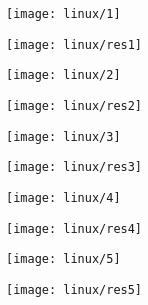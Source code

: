 \documentclass[draft,final]{vutinfth} %
\begin{document}
\begin{appendices}
		\begin{figure}[H]
			\centering
			\begin{subfigure}[b]{0.45\columnwidth}
				\centering
				\texttt{[image: linux/1]}
			\end{subfigure}
			\begin{subfigure}[b]{0.45\columnwidth}
				\centering
				\texttt{[image: linux/res1]}
			\end{subfigure}
		\end{figure}   
		\begin{figure}[H]
			\centering
			\begin{subfigure}[b]{0.45\columnwidth}
				\centering
				\texttt{[image: linux/2]}
			\end{subfigure}
			\begin{subfigure}[b]{0.45\columnwidth}
				\centering
				\texttt{[image: linux/res2]}
			\end{subfigure}
		\end{figure}   
		\begin{figure}[H]
			\centering
			\begin{subfigure}[b]{0.45\columnwidth}
				\centering
				\texttt{[image: linux/3]}
			\end{subfigure}
			\begin{subfigure}[b]{0.45\columnwidth}
				\centering
				\texttt{[image: linux/res3]}
			\end{subfigure}
		\end{figure}   
		\begin{figure}[H]
			\centering
			\begin{subfigure}[b]{0.45\columnwidth}
				\centering
				\texttt{[image: linux/4]}
			\end{subfigure}
			\begin{subfigure}[b]{0.45\columnwidth}
				\centering
				\texttt{[image: linux/res4]}
			\end{subfigure}
		\end{figure}   
		\begin{figure}[H]
			\centering
			\begin{subfigure}[b]{0.45\columnwidth}
				\centering
				\texttt{[image: linux/5]}
			\end{subfigure}
			\begin{subfigure}[b]{0.45\columnwidth}
				\centering
				\texttt{[image: linux/res5]}
			\end{subfigure}

\end{figure}
\end{appendices}
\end{document}
